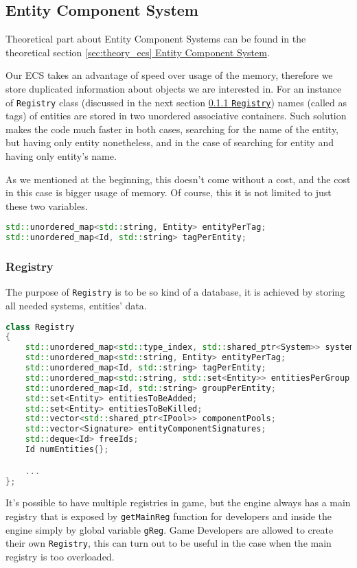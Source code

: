 \subsection{Entity Component System}
\label{sec:code_ecs}
\hspace{\parindent} Theoretical part about Entity Component Systems can be found in the theoretical section \hyperref[sec:theory_ecs]{\ref*{sec:theory_ecs} Entity Component System}.

Our ECS takes an advantage of speed over usage of the memory, therefore we store duplicated information about objects we are interested in. For an instance of \texttt{Registry} class (discussed in the next section \hyperref[sec:registry]{\ref*{sec:registry} \texttt{Registry}}) names (called as tags) of entities are stored in two unordered associative containers. Such solution makes the code much faster in both cases, searching for the name of the entity, but having only entity nonetheless, and in the case of searching for entity and having only entity's name.

As we mentioned at the beginning, this doesn't come without a cost, and the cost in this case is bigger usage of memory.
Of course, this it is not limited to just these two variables.\\

\begin{lstlisting}[language=c++, caption=Entities names (./engine/include/tsengine/ecs/ecs.h)]
std::unordered_map<std::string, Entity> entityPerTag;
std::unordered_map<Id, std::string> tagPerEntity;
\end{lstlisting}

\subsubsection{Registry}
\label{sec:registry}
\hspace{\parindent} The purpose of \texttt{Registry} is to be so kind of a database, it is achieved by storing all needed systems, entities' data.\\
\begin{lstlisting}[language=c++, caption=\texttt{Registry} class]
class Registry
{
    std::unordered_map<std::type_index, std::shared_ptr<System>> systems;
    std::unordered_map<std::string, Entity> entityPerTag;
    std::unordered_map<Id, std::string> tagPerEntity;
    std::unordered_map<std::string, std::set<Entity>> entitiesPerGroup;
    std::unordered_map<Id, std::string> groupPerEntity;
    std::set<Entity> entitiesToBeAdded;
    std::set<Entity> entitiesToBeKilled;
    std::vector<std::shared_ptr<IPool>> componentPools;
    std::vector<Signature> entityComponentSignatures;
    std::deque<Id> freeIds;
    Id numEntities{};

    ...
};
\end{lstlisting}
It's possible to have multiple registries in game, but the engine always has a main registry that is exposed by \texttt{getMainReg} function for developers and inside the engine simply by global variable \texttt{gReg}.
Game Developers are allowed to create their own \texttt{Registry}, this can turn out to be useful in the case when the main registry is too overloaded.

